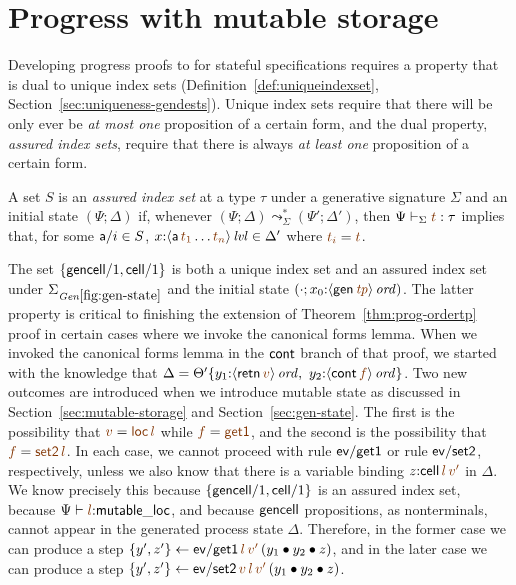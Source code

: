 \section{Progress with mutable storage}
\label{sec:progess-mutable}

Developing progress proofs to for stateful specifications requires a
property that is dual to unique index sets
(Definition~\ref{def:uniqueindexset},
Section~\ref{sec:uniqueness-gendests}). Unique index sets require that there
will be only ever be {\it at most one} proposition of a certain form, 
and the dual property, {\it assured index sets}, require that there is always
{\it at least one} proposition of a certain form. 

\bigskip
\begin{definition}
  A set $S$ is an {\em assured index set} at a type $\tau$ under a
  generative signature $\Sigma$ and an initial state $(\Psi; \Delta)$
  if, whenever $(\Psi; \Delta) \leadsto^*_{\Sigma} (\Psi'; \Delta')$,
  then $\Psi \vdash_\Sigma \lf{t} : \tau$ implies that, for some ${\sf
    a}/i \in S$, $x{:}\islvl{\susp{{\sf a}\,\lf{t_1}\ldots\lf{t_n}}}
  \in \Delta'$ where $\lf{t_i} = \lf{t}$. 
\end{definition}
\bigskip

The set $\{ {\sf gencell}/1, {\sf cell}/1 \}$ is both a unique
index set and an assured index set 
under $\siggenstate$ and the initial state 
$(\cdot; x_0{:}\istrue{\susp{{\sf gen}\,\lf{\it tp}}})$.
The latter property is critical to finishing
the extension of Theorem~\ref{thm:prog-ordertp} proof in certain cases
where we invoke the canonical forms lemma. When we invoked the
canonical forms lemma in the ${\sf cont}$ branch of that proof, we
started with the knowledge that $\Delta = \tackon{\Theta'}{
  y_1{:}\istrue{\susp{{\sf retn}\,\lf{v}}}, ~ y_2{:}\istrue{\susp{{\sf
        cont}\,\lf{f}}}}$. Two new outcomes are introduced when we
introduce mutable state as discussed in
Section~\ref{sec:mutable-storage} and Section~\ref{sec:gen-state}.
The first is the possibility that $\lf{v} = \lf{{\sf loc}\,l}$ while
$\lf{f} = \lf{\sf get1}$, and the second is the possibility that
$\lf{f} = \lf{{\sf set2}\,l}$. In each case, we cannot proceed with
rule ${\sf ev/get1}$ or rule ${\sf ev/set2}$, respectively, unless we
also know that there is a variable binding $z{:}{\sf
  cell}\,\lf{l}\,\lf{v'}$ in $\Delta$. We know precisely this because
$\{ {\sf gencell}/1, {\sf cell}/1 \}$ is an assured index set, because
$\Psi \vdash \lf{l} {:} {\sf mutable\_loc}$, and because ${\sf
  gencell}$ propositions, as nonterminals, cannot appear in the
generated process state $\Delta$. Therefore, in the former case we can
produce a step $\trstep{y', z'}{{\sf
    ev/get1}\,\lf{l}\,\lf{v'}\,(\tfuser{y_1}{\tfuser{y_2}{z}})}$, and
in the later case we can produce a step $\trstep{y', z'}{{\sf
    ev/set2}\,\lf{v}\,\lf{l}\,\lf{v'}\,(\tfuser{y_1}{\tfuser{y_2}{z}})}$.

